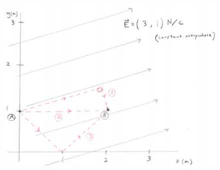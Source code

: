 \begin{figure}[H]
\includegraphics[scale=1.0]{figures/electric-flux-and-path-integral/fig2.png}
\end{figure}

\pagebreak \clearpage
